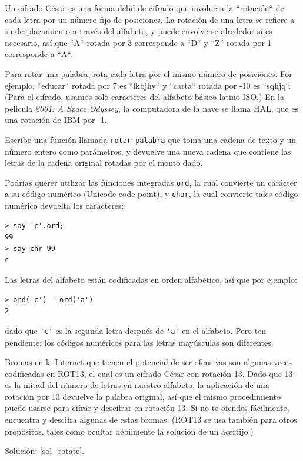 \begin{exercise}

\label{rotate}
Un cifrado César es una forma débil de cifrado que involucra
la ``rotación`` de cada letra por un número fijo de posiciones.
La rotación de una letra se refiere a su desplazamiento a través
del alfabeto, y puede envolverse alrededor si es necesario, 
así que ``A`` rotada por 3 corresponde a ``D`` y ``Z`` rotada por
1 corresponde a ``A``.

Para rotar una palabra, rota cada letra por el mismo número de posiciones.
For ejemplo, ``educar`` rotada por 7 es ``lkbjhy`` y ``carta`` rotada por 
-10  es ``sqhjq``. (Para el cifrado, usamos solo caracteres del alfabeto
básico latino ISO.) En la película
{\em 2001: A Space Odyssey}, la computadora de la nave se llama 
HAL, que es una rotación de IBM por -1.

Escribe una función llamada \verb|rotar-palabra| que toma una cadena de texto
y un número entero como parámetros, y devuelve una nueva cadena que 
contiene las letras de la cadena original rotadas por el monto dado.


Podrías querer utilizar las funciones integradas {\tt ord}, 
la cual convierte un carácter a su código numérico (Unicode code point),
y {\tt char}, la cual convierte tales código numérico devuelta los
caracteres:

\begin{lstlisting}
> say 'c'.ord;
99
> say chr 99
c
\end{lstlisting}
%

Las letras del alfabeto están codificadas en orden 
alfabético, así que por ejemplo:

\begin{lstlisting}
> ord('c') - ord('a')
2
\end{lstlisting}

dado que \verb|'c'| es la segunda letra después de \verb|'a'|
en el alfabeto. Pero ten pendiente: los códigos numéricos para
las letras mayúsculas son diferentes.

Bromas en la Internet que tienen el potencial de ser ofensivas
son algunas veces codificadas en ROT13, el cual es un cifrado 
César con rotación 13. Dado que 13 es la mitad del número de letras
en nuestro alfabeto, la aplicación de una rotación por 13 devuelve la
palabra original, así que el mismo procedimiento puede usarse
para cifrar y descifrar en rotación 13. Si no te ofendes fácilmente,
encuentra y descifra algunas de estas bromas. (ROT13 se usa también 
para otros propósitos, tales como ocultar débilmente la solución de
un acertijo.)

Solución: \ref{sol_rotate}.

\end{exercise}

